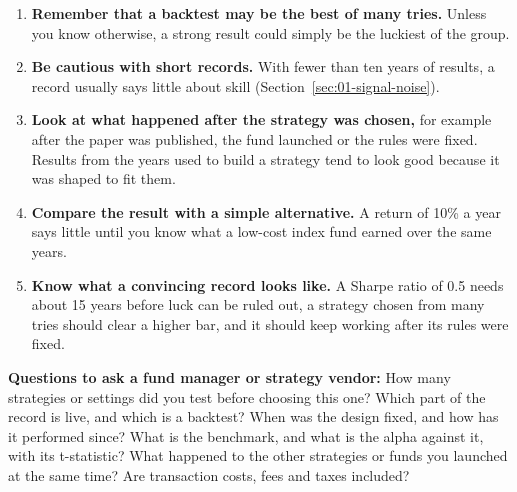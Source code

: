\begin{enumerate}
  \item \textbf{Remember that a backtest may be the best of many tries.} Unless you know otherwise, a strong result could simply be the luckiest of the group.
  \item \textbf{Be cautious with short records.} With fewer than ten years of results, a record usually says little about skill (Section~\ref{sec:01-signal-noise}).
  \item \textbf{Look at what happened after the strategy was chosen,} for example after the paper was published, the fund launched or the rules were fixed. Results from the years used to build a strategy tend to look good because it was shaped to fit them.
  \item \textbf{Compare the result with a simple alternative.} A return of 10\% a year says little until you know what a low-cost index fund earned over the same years.
  \item \textbf{Know what a convincing record looks like.} A Sharpe ratio of 0.5 needs about 15 years before luck can be ruled out, a strategy chosen from many tries should clear a higher bar, and it should keep working after its rules were fixed.
\end{enumerate}

\textbf{Questions to ask a fund manager or strategy vendor:} How many strategies or settings did you test before choosing this one? Which part of the record is live, and which is a backtest? When was the design fixed, and how has it performed since? What is the benchmark, and what is the alpha against it, with its t-statistic? What happened to the other strategies or funds you launched at the same time? Are transaction costs, fees and taxes included?
